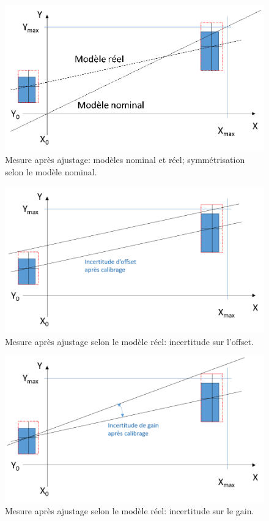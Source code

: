 \documentclass[main.tex]{subfiles}
\begin{document}
\begin{figure}
    \centering
    \includegraphics[width=12cm]{assets/figures/3_3a_reel_versus_nominal.PNG}
    \caption{Mesure après ajustage: modèles nominal et réel; symmétrisation selon le modèle nominal.}
    \label{fig:3_3a_reel_versus_nominal}
\end{figure}

\begin{figure}
    \centering
    \includegraphics[width=12cm]{assets/figures/Ajustage_reel_offset.PNG}
    \caption{Mesure après ajustage selon le modèle réel: incertitude sur l'offset.}
    \label{fig:Ajustage_reel_offset}
\end{figure}

\begin{figure}
    \centering
    \includegraphics[width=12cm]{assets/figures/Ajustage_reel_gain.PNG}
    \caption{Mesure après ajustage selon le modèle réel: incertitude sur le gain.}
    \label{fig:Ajustage_reel_gain}
\end{figure}
\end{document}
